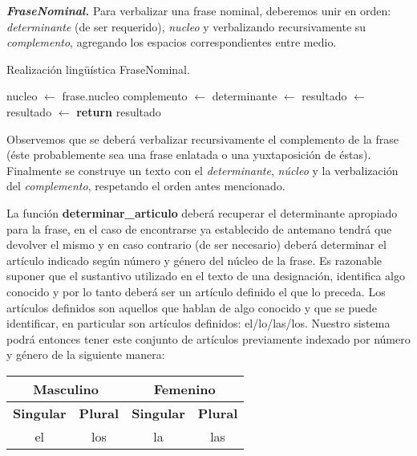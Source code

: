 \medskip
\noindent
\textbf{\emph{FraseNominal.}} Para verbalizar una frase nominal, deberemos unir en orden: \emph{determinante} (de ser requerido), \emph{nucleo} y verbalizando recursivamente su \emph{complemento}, agregando los espacios correspondientes entre medio.

\begin{algorithm}[H]
\caption{Realización lingüística FraseNominal.}
\begin{algorithmic}[1]
\State nucleo $\gets$ frase.nucleo
\State complemento $\gets$ 
\State determinante $\gets$ 
\State resultado $\gets$ 
\Else
\State resultado $\gets$ 
\EndIf
\Statex
\State \textbf{return} resultado
\EndFunction
\end{algorithmic}
\end{algorithm}

\noindent
Observemos que se deberá verbalizar recursivamente el complemento de la frase (éste probablemente sea una frase enlatada o una yuxtaposición de éstas). Finalmente se construye un texto con el \emph{determinante}, \emph{núcleo} y la verbalización del \emph{complemento}, respetando el orden antes mencionado.

La función \textbf{determinar\_articulo} deberá recuperar el determinante apropiado para la frase, en el caso de encontrarse ya establecido de antemano tendrá que devolver el mismo y en caso contrario (de ser necesario) deberá determinar el artículo indicado según número y género del núcleo de la frase. Es razonable suponer que el sustantivo utilizado en el texto de una designación, identifica algo conocido y por lo tanto deberá ser un artículo definido el que lo preceda. Los artículos definidos son aquellos que hablan de algo conocido y que se puede identificar, en particular son artículos definidos: el/lo/las/los. Nuestro sistema podrá entonces tener este conjunto de artículos previamente indexado por número y género de la siguiente manera:

\begin{table}[H]
\centering
\begin{tabular}{|c|c|c|c|}
\hline
\multicolumn{2}{|c|}{\textbf{Masculino}} & \multicolumn{2}{c|}{\textbf{Femenino}} \\ \hline
\textbf{Singular}    & \textbf{Plural}   & \textbf{Singular}   & \textbf{Plural}  \\ \hline
el                   & los               & la                  & las              \\ \hline
\end{tabular}
\end{table}

